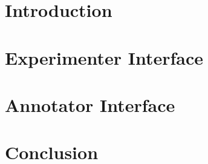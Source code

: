 \documentclass[11pt, final]{ucthesis}
\begin{document}

\begin{dissertationText}
\renewcommand{\baselinestretch}{1.66}

\chapter{Introduction
    \label{chap:introduction}}    %

\chapter{Experimenter Interface
    \label{chap:experimenter}}
    
\chapter{Annotator Interface
    \label{chap:annotator}}
    
\chapter{Conclusion
    \label{chap:conclusion}}
    


\clearpage


\ssp    %




%    
\end{dissertationText}
\end{document}
